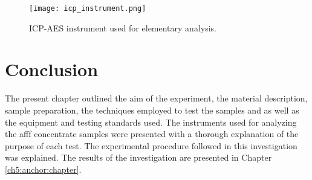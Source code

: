 \begin{figure}[H]
    \centering
    \texttt{[image: icp\_instrument.png]}
    \caption{ICP-AES instrument used for elementary analysis.}
    \label{ch4:figure:icp-aes}
\end{figure}

\section{Conclusion}
The present chapter outlined the aim of the experiment, the material description, sample preparation, the techniques employed to test the samples and as well as the equipment and testing standards used. The instruments used for analyzing the \acrshort{afff} concentrate samples were presented with a thorough explanation of the purpose of each test. The experimental procedure followed in this investigation was explained. The results of the investigation are presented in Chapter \ref{ch5:anchor:chapter}.
